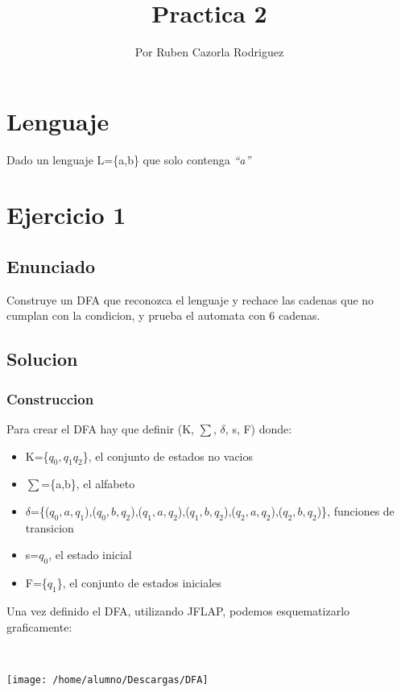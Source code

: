 \documentclass[english]{article}
\begin{document}
\title{Practica 2}
\author{Por Ruben Cazorla Rodriguez}
\maketitle

\section*{Lenguaje}

\noindent Dado un lenguaje L=\{a,b\} que solo contenga \textsl{``a''}

\section{{\LARGE{}Ejercicio 1}}

\subsection{{\Large{}Enunciado}}

Construye un DFA que reconozca el lenguaje y rechace las cadenas que
no cumplan con la condicion, y prueba el automata con 6 cadenas.

\subsection{{\Large{}Solucion}}

\subsubsection{{\large{}Construccion}}

Para crear el DFA hay que definir (K, $\sum$, $\delta$, s, F) donde:
\begin{itemize}
\item K=\{$q_{0},q_{1}q_{2}$\}, el conjunto de estados no vacios
\item $\sum$=\{a,b\}, el alfabeto
\item $\delta$=\{($q_{0},a,q_{1}$),($q_{0},b,q_{2}$),($q_{1},a,q_{2}$),($q_{1},b,q_{2}$),($q_{2},a,q_{2}$),($q_{2},b,q_{2}$)\},
funciones de transicion
\item s=$q_{0}$, el estado inicial
\item F=\{$q_{1}$\}, el conjunto de estados iniciales
\end{itemize}
Una vez definido el DFA, utilizando JFLAP, podemos esquematizarlo
graficamente:

\,
\begin{center}
\texttt{[image: /home/alumno/Descargas/DFA]}
\par\end{center}
\end{document}
